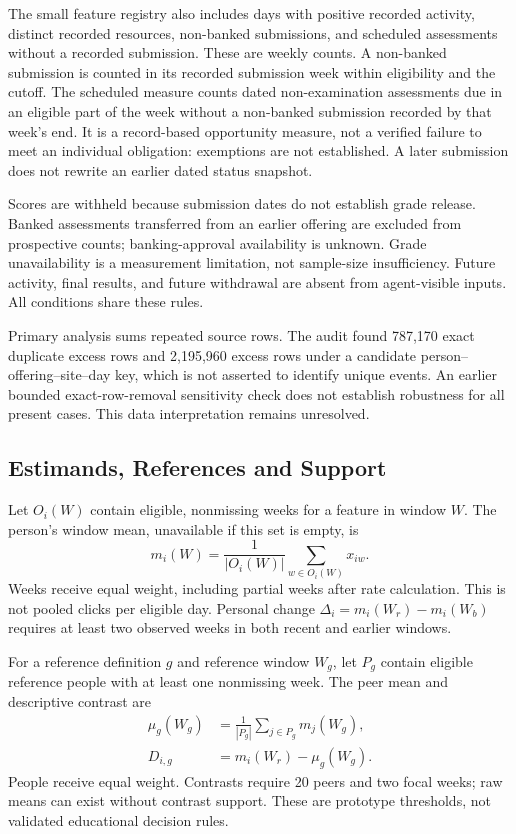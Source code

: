 The small feature registry also includes days with positive recorded activity, distinct recorded resources, non-banked submissions, and scheduled assessments without a recorded submission. These are weekly counts. A non-banked submission is counted in its recorded submission week within eligibility and the cutoff. The scheduled measure counts dated non-examination assessments due in an eligible part of the week without a non-banked submission recorded by that week's end. It is a record-based opportunity measure, not a verified failure to meet an individual obligation: exemptions are not established. A later submission does not rewrite an earlier dated status snapshot.

Scores are withheld because submission dates do not establish grade release. Banked assessments transferred from an earlier offering are excluded from prospective counts; banking-approval availability is unknown. Grade unavailability is a measurement limitation, not sample-size insufficiency. Future activity, final results, and future withdrawal are absent from agent-visible inputs. All conditions share these rules.

Primary analysis sums repeated source rows. The audit found 787,170 exact duplicate excess rows and 2,195,960 excess rows under a candidate person--offering--site--day key, which is not asserted to identify unique events. An earlier bounded exact-row-removal sensitivity check does not establish robustness for all present cases. This data interpretation remains unresolved.

\subsection{Estimands, References and Support}
Let $O_i(W)$ contain eligible, nonmissing weeks for a feature in window $W$. The person's window mean, unavailable if this set is empty, is
\begin{equation}
m_i(W)=\frac{1}{|O_i(W)|}\sum_{w\in O_i(W)}x_{iw}.
\label{eq:person}
\end{equation}
Weeks receive equal weight, including partial weeks after rate calculation. This is not pooled clicks per eligible day. Personal change $\Delta_i=m_i(W_r)-m_i(W_b)$ requires at least two observed weeks in both recent and earlier windows.

For a reference definition $g$ and reference window $W_g$, let $P_g$ contain eligible reference people with at least one nonmissing week. The peer mean and descriptive contrast are
\begin{align}
\mu_g(W_g)&=\frac{1}{|P_g|}\sum_{j\in P_g}m_j(W_g),\\
D_{i,g}&=m_i(W_r)-\mu_g(W_g).
\end{align}
People receive equal weight. Contrasts require 20 peers and two focal weeks; raw means can exist without contrast support. These are prototype thresholds, not validated educational decision rules.

